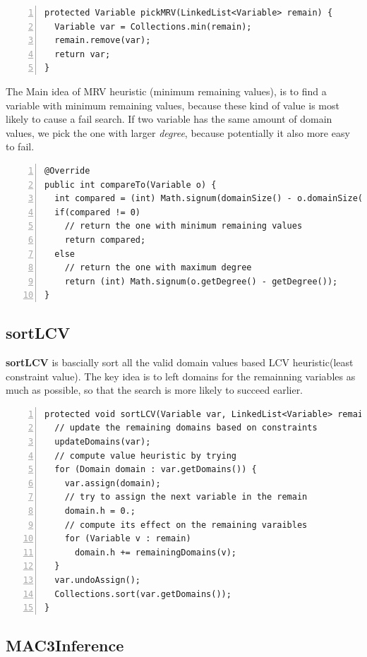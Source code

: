 \documentclass{article}
\begin{document}
\begin{lstlisting}[numbers=left]   
protected Variable pickMRV(LinkedList<Variable> remain) {
  Variable var = Collections.min(remain);
  remain.remove(var);
  return var;
}
\end{lstlisting}

The Main idea of MRV heuristic (minimum remaining values), is to find a variable with minimum remaining values, because these kind of value is most likely to cause a fail search. If two variable has the same amount of domain values, we pick the one with larger \emph{degree}, because potentially it also more easy to fail.

\begin{lstlisting}[numbers=left]    
@Override
public int compareTo(Variable o) {
  int compared = (int) Math.signum(domainSize() - o.domainSize());
  if(compared != 0)
    // return the one with minimum remaining values
    return compared;
  else
    // return the one with maximum degree
    return (int) Math.signum(o.getDegree() - getDegree());
}
\end{lstlisting}

\subsection{sortLCV}

\textbf{sortLCV} is bascially sort all the valid domain values based LCV heuristic(least constraint value). The key idea is to left domains for the remainning variables as much as possible, so that the search is more likely to succeed earlier.

\begin{lstlisting}[numbers=left]   
protected void sortLCV(Variable var, LinkedList<Variable> remain) {
  // update the remaining domains based on constraints
  updateDomains(var);
  // compute value heuristic by trying
  for (Domain domain : var.getDomains()) {
    var.assign(domain);
    // try to assign the next variable in the remain
    domain.h = 0.;
    // compute its effect on the remaining varaibles
    for (Variable v : remain)
      domain.h += remainingDomains(v);
  }
  var.undoAssign();
  Collections.sort(var.getDomains());
}
\end{lstlisting}









\clearpage
\subsection{MAC3Inference}
\end{document}
